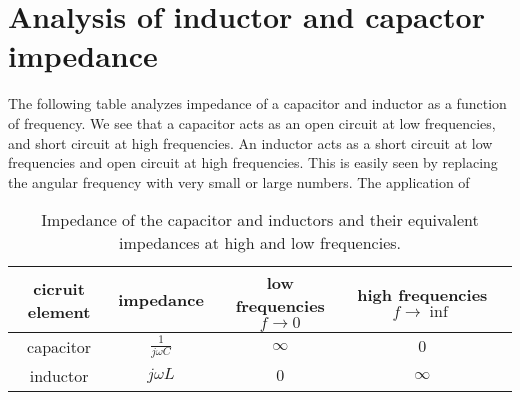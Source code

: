 \documentclass{ximera}
\begin{document}
\section{Analysis of inductor and capactor impedance}

The following table analyzes impedance of a capacitor and inductor as a function of frequency. We see that a capacitor acts as an open circuit at low frequencies, and short circuit at high frequencies. An inductor acts as a short circuit at low frequencies and open circuit at high frequencies. This is easily seen by replacing the angular frequency with very small or large numbers. The application of 

\begin{table}[htbp]
\centering
\begin{tabular}{|c|c|c|c|c|} \hline
cicruit element & impedance & low frequencies $f \to 0$& high frequencies $f \to \inf$   \\  \hline  
 capacitor     & $\frac{1}{j \omega C}$    & $\infty$ & $0$    \\  \hline       
 inductor & $j \omega L$              &    $0$   &       $\infty $             \\ \hline
\end{tabular}
\caption{Impedance of the capacitor and inductors and their equivalent impedances at high and low frequencies.}
\end{table}
\end{document}
